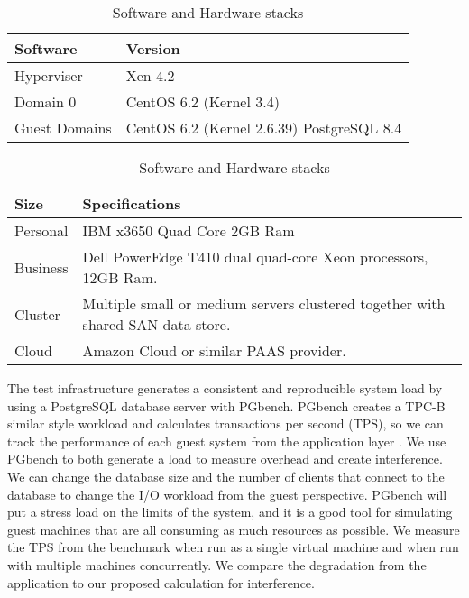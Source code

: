 \begin{table}[h]
\begin{subtable}[h]{0.45\textwidth}
\begin{tabular}{ l p{5cm} }
  Software & Version \\
  \hline
  Hyperviser & Xen 4.2 \\
  Domain 0 & CentOS 6.2 (Kernel 3.4) \\
  Guest Domains & CentOS 6.2 (Kernel 2.6.39) PostgreSQL 8.4 \\
  \hline
\end{tabular}
\caption{Software installed virtualization test stack}
\label{softStack}
\end{subtable}
\hfill
\begin{subtable}[h]{0.45\textwidth}
\begin{tabular}{ l p{5cm} }
  Size & Specifications \\
  \hline
  Personal & IBM x3650 Quad Core 2GB Ram \\
  Business & Dell PowerEdge T410 dual quad-core Xeon processors, 12GB Ram. \\
  Cluster & Multiple small or medium servers clustered together with shared SAN data store. \\
  Cloud & Amazon Cloud or similar PAAS provider. \\
  \hline
\end{tabular}
\caption{Virtualization sizes for tests}
\label{virtSize}
\end{subtable}
\caption{Software and Hardware stacks}
\end{table}

The test infrastructure generates a consistent and reproducible system load by using a PostgreSQL database server with PGbench.  
 PGbench creates a TPC-B similar style workload and calculates transactions per second (TPS), so we can track the performance of each guest system from the application layer \cite{pgTune}.  
 We use PGbench to both generate a load to measure overhead and create interference.  
 We can change the database size and the number of clients that connect to the database to change the I/O workload from the guest perspective.
PGbench will put a stress load on the limits of the system, and it is a good tool for simulating guest machines that are all consuming as much resources as possible.  
 We measure the TPS from the benchmark when run as a single virtual machine and when run with multiple machines concurrently.  We compare the degradation from the application to our proposed calculation for interference.

